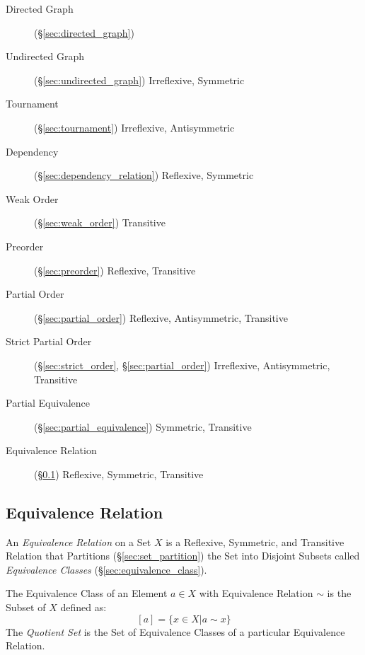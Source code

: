 \begin{description}
\item [Directed Graph] (\S\ref{sec:directed_graph})

\item [Undirected Graph] (\S\ref{sec:undirected_graph}) Irreflexive, Symmetric

\item [Tournament] (\S\ref{sec:tournament}) Irreflexive, Antisymmetric

\item [Dependency] (\S\ref{sec:dependency_relation}) Reflexive, Symmetric

\item [Weak Order] (\S\ref{sec:weak_order}) Transitive

\item [Preorder] (\S\ref{sec:preorder}) Reflexive, Transitive

\item [Partial Order] (\S\ref{sec:partial_order}) Reflexive,
  Antisymmetric, Transitive

\item [Strict Partial Order] (\S\ref{sec:strict_order},
  \S\ref{sec:partial_order}) Irreflexive, Antisymmetric, Transitive

\item [Partial Equivalence] (\S\ref{sec:partial_equivalence})
  Symmetric, Transitive

\item [Equivalence Relation] (\S\ref{sec:equivalence_relation})
  Reflexive, Symmetric, Transitive

\end{description}



\subsection{Equivalence Relation}\label{sec:equivalence_relation}

An \emph{Equivalence Relation} on a Set $X$ is a Reflexive, Symmetric,
and Transitive Relation that Partitions (\S\ref{sec:set_partition})
the Set into Disjoint Subsets called \emph{Equivalence Classes}
(\S\ref{sec:equivalence_class}).

The Equivalence Class of an Element $a \in X$ with Equivalence
Relation $\sim$ is the Subset of $X$ defined as:
\[
    [a] = \{x \in X | a \sim x\}
\]
The \emph{Quotient Set} is the Set of Equivalence Classes of a
particular Equivalence Relation.

